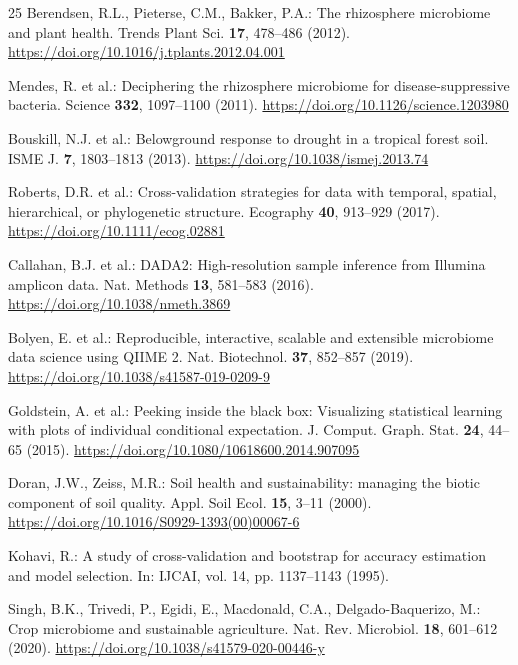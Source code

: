 \documentclass[runningheads,a4paper,oribibl]{llncs}
\begin{document}
\begin{thebibliography}{25}
Berendsen, R.L., Pieterse, C.M., Bakker, P.A.: The rhizosphere microbiome and plant health. Trends Plant Sci. \textbf{17}, 478--486 (2012). \url{https://doi.org/10.1016/j.tplants.2012.04.001}

Mendes, R. et al.: Deciphering the rhizosphere microbiome for disease-suppressive bacteria. Science \textbf{332}, 1097--1100 (2011). \url{https://doi.org/10.1126/science.1203980}

Bouskill, N.J. et al.: Belowground response to drought in a tropical forest soil. ISME J. \textbf{7}, 1803--1813 (2013). \url{https://doi.org/10.1038/ismej.2013.74}

Roberts, D.R. et al.: Cross-validation strategies for data with temporal, spatial, hierarchical, or phylogenetic structure. Ecography \textbf{40}, 913--929 (2017). \url{https://doi.org/10.1111/ecog.02881}

Callahan, B.J. et al.: DADA2: High-resolution sample inference from Illumina amplicon data. Nat. Methods \textbf{13}, 581--583 (2016). \url{https://doi.org/10.1038/nmeth.3869}

Bolyen, E. et al.: Reproducible, interactive, scalable and extensible microbiome data science using QIIME 2. Nat. Biotechnol. \textbf{37}, 852--857 (2019). \url{https://doi.org/10.1038/s41587-019-0209-9}

Goldstein, A. et al.: Peeking inside the black box: Visualizing statistical learning with plots of individual conditional expectation. J. Comput. Graph. Stat. \textbf{24}, 44--65 (2015). \url{https://doi.org/10.1080/10618600.2014.907095}

Doran, J.W., Zeiss, M.R.: Soil health and sustainability: managing the biotic component of soil quality. Appl. Soil Ecol. \textbf{15}, 3--11 (2000). \url{https://doi.org/10.1016/S0929-1393(00)00067-6}



Kohavi, R.: A study of cross-validation and bootstrap for accuracy estimation and model selection. In: IJCAI, vol. 14, pp. 1137--1143 (1995).

Singh, B.K., Trivedi, P., Egidi, E., Macdonald, C.A., Delgado-Baquerizo, M.: Crop microbiome and sustainable agriculture. Nat. Rev. Microbiol. \textbf{18}, 601--612 (2020). \url{https://doi.org/10.1038/s41579-020-00446-y}

\end{thebibliography}
\end{document}
